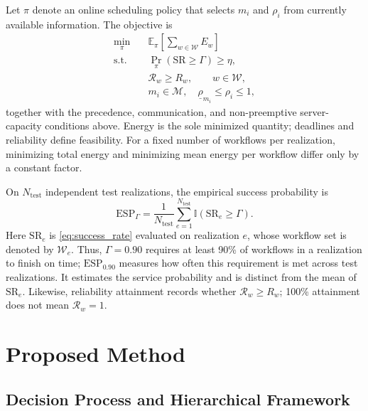 \documentclass[lettersize,journal]{IEEEtran}
\newcommand{\ind}{\mathbb{I}}
\begin{document}
Let $\pi$ denote an online scheduling policy that selects $m_i$ and
$\rho_i$ from currently available information. The objective is
\begin{align}
 \min_{\pi}\quad&
 \mathbb E_\pi\!\left[\sum_{w\in\mathcal W}E_w\right]
 \label{eq:objective}\\
 \text{s.t.}\quad&
 \Pr_\pi(\mathrm{SR}\geq\Gamma)\geq\eta,\nonumber\\
 &\mathcal R_w\geq R_w,\qquad w\in\mathcal W,\nonumber\\
 &m_i\in\mathcal M,\quad
 \underline\rho_{m_i}\leq\rho_i\leq1,\nonumber
\end{align}
together with the precedence, communication, and non-preemptive
server-capacity conditions above. Energy is the sole minimized
quantity; deadlines and reliability define feasibility.
For a fixed number of workflows per realization, minimizing total
energy and minimizing mean energy per workflow differ only by a
constant factor.

On $N_{\mathrm{test}}$ independent test realizations, the empirical
success probability is
\begin{equation}
 \mathrm{ESP}_{\Gamma}=
 \frac{1}{N_{\mathrm{test}}}
 \sum_{e=1}^{N_{\mathrm{test}}}\ind(\mathrm{SR}_e\geq\Gamma).
 \label{eq:esp}
\end{equation}
Here $\mathrm{SR}_e$ is \eqref{eq:success_rate} evaluated on realization
$e$, whose workflow set is denoted by $\mathcal W_e$.
Thus, $\Gamma=0.90$ requires at least 90\% of workflows in a realization
to finish on time; $\mathrm{ESP}_{0.90}$ measures how often this
requirement is met across test realizations. It estimates the
service probability and is distinct from the mean of
$\mathrm{SR}_e$. Likewise, reliability attainment records whether
$\mathcal R_w\geq R_w$; 100\% attainment does not mean
$\mathcal R_w=1$.

\section{Proposed Method}
\label{sec:method}

\subsection{Decision Process and Hierarchical Framework}
\label{subsec:framework}
\end{document}
